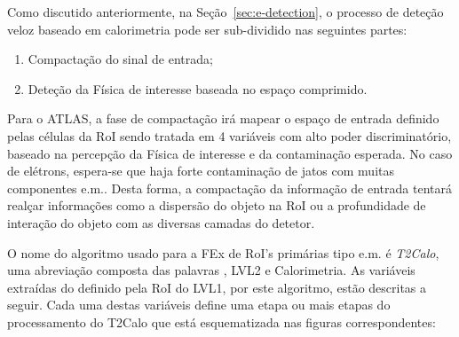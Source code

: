 Como discutido anteriormente, na Seção~\ref{sec:e-detection}, o processo de
deteção veloz baseado em calorimetria pode ser sub-dividido nas seguintes partes:

\begin{enumerate}
\item Compactação do sinal de entrada;
\item Deteção da Física de interesse baseada no espaço comprimido.
\end{enumerate}

Para o ATLAS, a fase de compactação irá mapear o espaço de entrada definido
pelas células da RoI sendo tratada em 4 variáveis com alto poder
discriminatório, baseado na percepção da Física de interesse e da contaminação
esperada. No caso de elétrons, espera-se que haja forte contaminação de jatos
com muitas componentes e.m.. Desta forma, a compactação da informação de entrada
tentará realçar informações como a dispersão do objeto na RoI ou a
profundidade de interação do objeto com as diversas camadas do detetor.

O nome do algoritmo usado para a FEx de RoI's primárias tipo e.m. é
\emph{T2Calo}, uma abreviação composta das palavras , LVL2 e
Calorimetria. As variáveis extraídas do  definido pela RoI do
LVL1, por este algoritmo, estão descritas a seguir. Cada uma destas variáveis
define uma etapa ou mais etapas do processamento do T2Calo que está
esquematizada nas figuras correspondentes:

